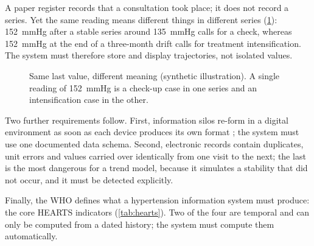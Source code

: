 A paper register records that a consultation took place; it does not record a series. Yet the same reading means different things in different series (\cref{fig:act-series}): 152~mmHg after a stable series around 135~mmHg calls for a check, whereas 152~mmHg at the end of a three-month drift calls for treatment intensification. The system must therefore store and display trajectories, not isolated values.

\begin{figure}[htbp]
\centering
{}
\caption{Same last value, different meaning (synthetic illustration). A single reading of 152~mmHg is a check-up case in one series and an intensification case in the other.}\label{fig:act-series}
\end{figure}

Two further requirements follow. First, information silos re-form in a digital environment as soon as each device produces its own format \parencite{liu2025review}; the system must use one documented data schema. Second, electronic records contain duplicates, unit errors and values carried over identically from one visit to the next; the last is the most dangerous for a trend model, because it simulates a stability that did not occur, and it must be detected explicitly.

Finally, the WHO defines what a hypertension information system must produce: the core HEARTS indicators (\cref{tab:hearts}). Two of the four are temporal and can only be computed from a dated history; the system must compute them automatically.

